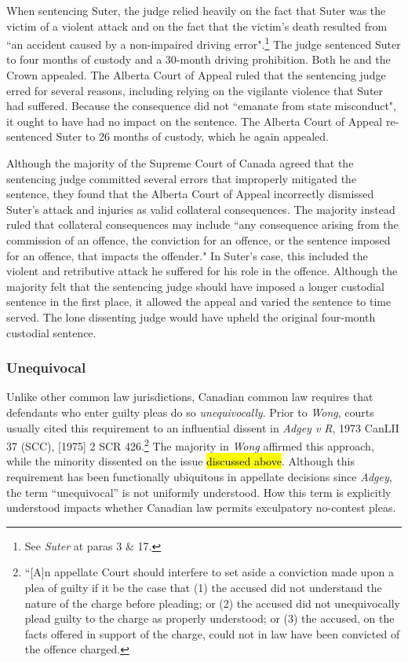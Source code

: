 When sentencing Suter, the judge relied heavily on the fact that Suter was the victim of a violent attack and on the fact that the victim's death resulted from ``an accident caused by a non-impaired driving error".\footnote{See \textit{Suter} at paras 3 \& 17.} The judge sentenced Suter to four months of custody and a 30-month driving prohibition. Both he and the Crown appealed. The Alberta Court of Appeal ruled that the sentencing judge erred for several reasons, including relying on the vigilante violence that Suter had suffered. Because the consequence did not ``emanate from state misconduct", it ought to have had no impact on the sentence. The Alberta Court of Appeal re-sentenced Suter to 26 months of custody, which he again appealed. 

Although the majority of the Supreme Court of Canada agreed that the sentencing judge committed several errors that improperly mitigated the sentence, they found that the Alberta Court of Appeal incorrectly dismissed Suter's attack and injuries as valid collateral consequences. The majority instead ruled that collateral consequences may include ``any consequence arising from the commission of an offence, the conviction for an offence, or the sentence imposed for an offence, that impacts the offender." In Suter's case, this included the violent and retributive attack he suffered for his role in the offence. Although the majority felt that the sentencing judge should have imposed a longer custodial sentence in the first place, it allowed the appeal and varied the sentence to time served. The lone dissenting judge would have upheld the original four-month custodial sentence.

\subsubsection{Unequivocal}

Unlike other common law jurisdictions, Canadian common law requires that defendants who enter guilty pleas do so \textit{unequivocally}. Prior to \textit{Wong}, courts usually cited this requirement to an influential dissent in \textit{Adgey v R}, 1973 CanLII 37 (SCC), [1975] 2 SCR 426.\footnote{``[A]n appellate Court should interfere to set aside a conviction made upon a plea of guilty if it be the case that (1) the accused did not understand the nature of the charge before pleading; or (2) the accused did not unequivocally plead guilty to the charge as properly understood; or (3) the accused, on the facts offered in support of the charge, could not in law have been convicted of the offence charged.} The majority in \textit{Wong} affirmed this approach, while the minority dissented on the issue \hl{discussed above}. Although this requirement has been functionally ubiquitous in appellate decisions since \textit{Adgey}, the term ``unequivocal'' is not uniformly understood. How this term is explicitly understood impacts whether Canadian law permits exculpatory no-contest pleas. 

